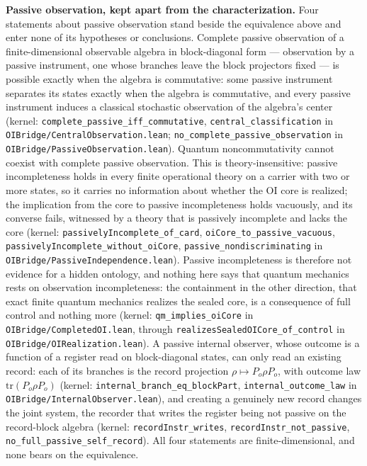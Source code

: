 \documentclass[
]{article}
\begin{document}
\textbf{Passive observation, kept apart from the characterization.} Four
statements about passive observation stand beside the equivalence above
and enter none of its hypotheses or conclusions. Complete passive
observation of a finite-dimensional observable algebra in block-diagonal
form --- observation by a passive instrument, one whose branches leave
the block projectors fixed --- is possible exactly when the algebra is
commutative: some passive instrument separates its states exactly when
the algebra is commutative, and every passive instrument induces a
classical stochastic observation of the algebra's center (kernel:
\texttt{complete\_passive\_iff\_commutative},
\texttt{central\_classification} in
\texttt{OIBridge/CentralObservation.lean};
\texttt{no\_complete\_passive\_observation} in
\texttt{OIBridge/PassiveObservation.lean}). Quantum noncommutativity
cannot coexist with complete passive observation. This is
theory-insensitive: passive incompleteness holds in every finite
operational theory on a carrier with two or more states, so it carries
no information about whether the OI core is realized; the implication
from the core to passive incompleteness holds vacuously, and its
converse fails, witnessed by a theory that is passively incomplete and
lacks the core (kernel: \texttt{passivelyIncomplete\_of\_card},
\texttt{oiCore\_to\_passive\_vacuous},
\texttt{passivelyIncomplete\_without\_oiCore},
\texttt{passive\_nondiscriminating} in
\texttt{OIBridge/PassiveIndependence.lean}). Passive incompleteness is
therefore not evidence for a hidden ontology, and nothing here says that
quantum mechanics rests on observation incompleteness: the containment
in the other direction, that exact finite quantum mechanics realizes the
sealed core, is a consequence of full control and nothing more (kernel:
\texttt{qm\_implies\_oiCore} in \texttt{OIBridge/CompletedOI.lean},
through \texttt{realizesSealedOICore\_of\_control} in
\texttt{OIBridge/OIRealization.lean}). A passive internal observer,
whose outcome is a function of a register read on block-diagonal states,
can only read an existing record: each of its branches is the record
projection \(\rho \mapsto P_o \rho P_o\), with outcome law
\(\mathrm{tr}(P_o \rho P_o)\) (kernel:
\texttt{internal\_branch\_eq\_blockPart},
\texttt{internal\_outcome\_law} in
\texttt{OIBridge/InternalObserver.lean}), and creating a genuinely new
record changes the joint system, the recorder that writes the register
being not passive on the record-block algebra (kernel:
\texttt{recordInstr\_writes}, \texttt{recordInstr\_not\_passive},
\texttt{no\_full\_passive\_self\_record}). All four statements are
finite-dimensional, and none bears on the equivalence.
\end{document}
